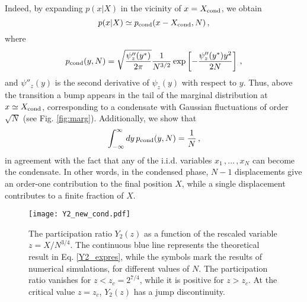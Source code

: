 \documentclass[aps,pre,twocolumn,superscriptaddress,showpacs]{revtex4-1}
\newcommand{\be}{\begin{equation}}
\newcommand{\ee}{\end{equation}}
\begin{document}
Indeed, by expanding $p(x|X)$ in the vicinity of $x=X_{\rm cond}$, we obtain
\begin{equation}
p(x|X)\simeq
p_{\rm cond}(x-X_{\rm cond},N)\,,
\end{equation}
where
\be
p_{\rm cond}(y,N) =\sqrt{\frac{\psi''_z(y^*)}{2\pi}} \frac{1}{N^{3/2}}\exp\left[-\frac{\psi''_z(y^*)  y^2}{2N}\right]\,,
\ee
and $\psi''_z(y)$ is the second derivative of $\psi_z(y)$ with respect to $y$. Thus, above the transition a bump appears in the tail of the marginal distribution at $x\simeq X_{\rm cond}$, corresponding to a condensate with Gaussian fluctuations of order $\sqrt{N}$ (see Fig. \ref{fig:marg}). Additionally, we show that
\be 
\int_{-\infty}^{\infty}dy\,p_{\rm cond}(y,N)=\frac{1}{N}\,,
\label{area}
\ee
in agreement with the fact that any of the i.i.d. variables $x_1\,,\ldots\,,x_N$ can become the condensate. In other words, in the condensed phase, $N-1$ displacements give an order-one contribution to the final position $X$, while a single displacement contributes to a finite fraction of $X$.


\begin{figure}
\texttt{[image: Y2\_new\_cond.pdf]}
\caption{The participation ratio $Y_2(z)$ as a function of the rescaled variable $z=X /N^{3/4}$. The continuous blue line represents the theoretical result in Eq. \eqref{Y2_expres}, while the symbols mark the results of numerical simulations, for different values of $N$. The participation ratio vanishes for $z<z_c=2^{7/4}$, while it is positive for $z>z_c$. At the critical value $z=z_c$, $Y_2(z)$ has a jump discontinuity.}
\label{fig:Y2}
\end{figure}
\end{document}
